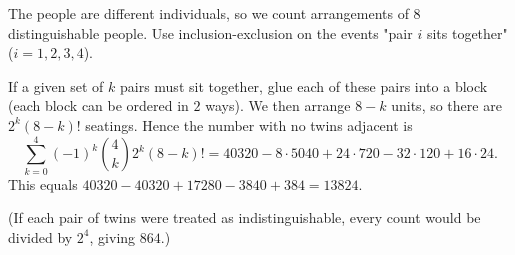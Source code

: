 The people are different individuals, so we count arrangements of $8$ distinguishable people. Use inclusion-exclusion on the events "pair $i$ sits together" ($i=1,2,3,4$).

If a given set of $k$ pairs must sit together, glue each of these pairs into a block (each block can be ordered in $2$ ways). We then arrange $8-k$ units, so there are $2^k(8-k)!$ seatings. Hence the number with no twins adjacent is
\[\sum_{k=0}^4(-1)^k\binom4k2^k(8-k)!=40320-8\cdot5040+24\cdot720-32\cdot120+16\cdot24.\]
This equals $40320-40320+17280-3840+384=\boxed{13824}$.

(If each pair of twins were treated as indistinguishable, every count would be divided by $2^4$, giving $864$.)

